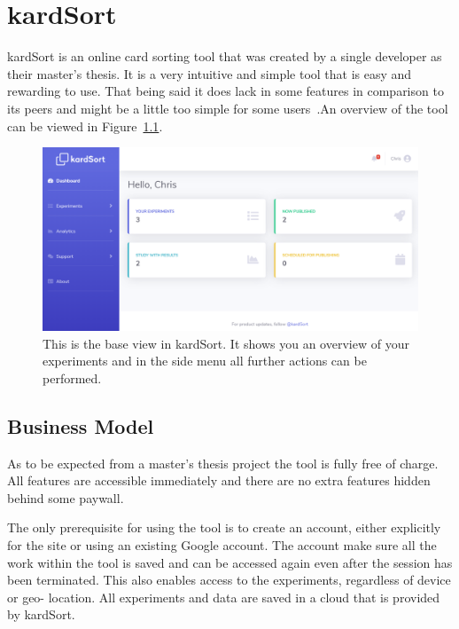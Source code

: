 \chapter{kardSort}

\label{chap:kardSort}


kardSort is an online card sorting tool that was created by a single developer
as their master's thesis. It is a very intuitive and simple tool that is easy
and rewarding to use. That being said it does lack in some features in
comparison to its peers and might be a little too simple for some
users~\parencite{kardSort}.An overview of the tool can be viewed in
Figure~\ref{fig:kardSort1}.

\begin{figure}[tp] 
\centering
\includegraphics[keepaspectratio,width=\linewidth,height=\halfh]{images/kardsort-dashboard.png}
\caption[kardSort Application] { This is the base view in kardSort.
It shows you an overview of your experiments and in the side menu all
further actions can be performed.
 }
\label{fig:kardSort1}
\end{figure}


\section{Business Model}
As to be expected from a master's thesis project the tool is fully 
free of charge. All features are accessible immediately and there are
no extra features hidden behind some paywall.

The only prerequisite for using the tool is to create an account,
either explicitly for the site or using an existing Google account.
The account make sure all the work within the tool is saved and can be
accessed again even after the session has been terminated. This also
enables access to the experiments, regardless of device or geo-
location. All experiments and data are saved in a cloud that is
provided by kardSort.

